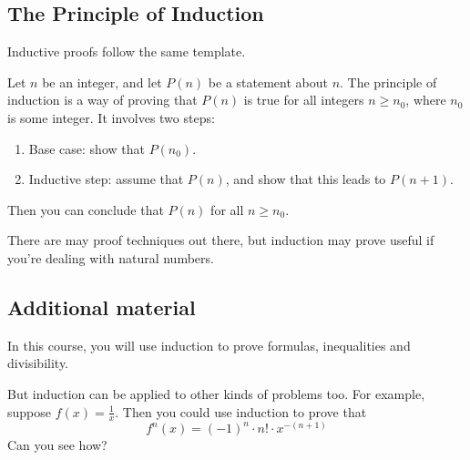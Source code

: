 \documentclass{scrreprt}
\begin{document}
\subsection*{The Principle of Induction}
Inductive proofs follow the same template.

\begin{theorem}
    Let $n$ be an integer, and let $P(n)$ be a statement about $n$. The principle of induction is a way of proving that $P(n)$ is true for all integers $n \geq n_0$, where $n_0$ is some integer. It involves two steps:
    \begin{enumerate}
        \item Base case: show that $P(n_0)$.
        \item Inductive step: assume that $P(n)$, and show that this leads to $P(n + 1)$.
    \end{enumerate}
    Then you can conclude that $P(n)$ for all $n \geq n_0$.
\end{theorem}

There are may proof techniques out there, but induction may prove useful if you're dealing with natural numbers.

\subsection*{Additional material}
In this course, you will use induction to prove formulas, inequalities and divisibility.

But induction can be applied to other kinds of problems too. For example, suppose $f(x) = \frac{1}{x}$. Then you could use induction to prove that $$f^n(x) = (-1)^n \cdot n! \cdot x^{-(n + 1)}$$ Can you see how?
\end{document}
